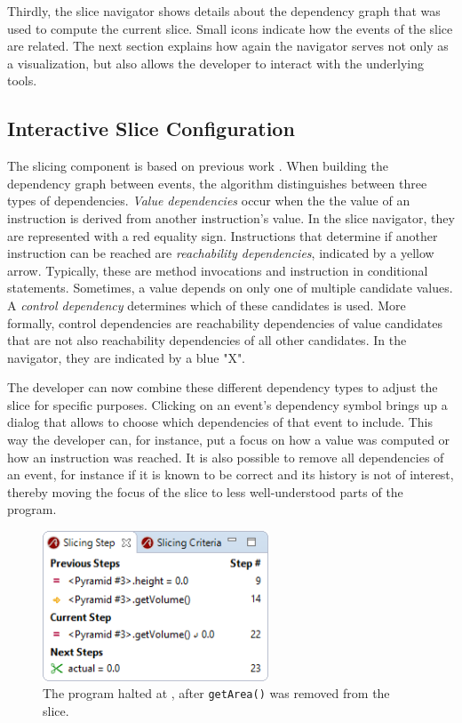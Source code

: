 ﻿\documentclass[
      english,
      ]{llncs}
\begin{document}
Thirdly, the slice navigator shows details about the dependency graph that was used to compute the current slice.
Small icons indicate how the events of the slice are related.
The next section explains how again the navigator serves not only as a visualization, but also allows the developer to interact with the underlying tools.

\subsection{Interactive Slice Configuration}

The slicing component is based on previous work \todo{[xxx]}.
When building the dependency graph between events, the algorithm distinguishes between three types of dependencies.
\emph{Value dependencies} occur when the the value of an instruction is derived from another instruction's value.
In the slice navigator, they are represented with a red equality sign.
Instructions that determine if another instruction can be reached are \emph{reachability dependencies}, indicated by a yellow arrow.
Typically, these are method invocations and instruction in conditional statements.
Sometimes, a value depends on only one of multiple candidate values. 
A \emph{control dependency} determines which of these candidates is used.
More formally, control dependencies are reachability dependencies of value candidates that are not also reachability dependencies of all other candidates.
In the navigator, they are indicated by a blue "X".

The developer can now combine these different dependency types to adjust the slice for specific purposes.
Clicking on an event's dependency symbol brings up a dialog that allows to choose which dependencies of that event to include.
This way the developer can, for instance, put a focus on how a value was computed or how an instruction was reached.
It is also possible to remove all dependencies of an event, for instance if it is known to be correct and its history is not of interest, thereby moving the focus of the slice to less well-understood parts of the program.

\begin{figure}
	\centering
		\includegraphics[width=0.60\textwidth]{slice2.png}
	\caption{The program halted at , after \lstinline{getArea()} was removed from the slice.}
	\label{fig:slice2}
\end{figure}
\end{document}
